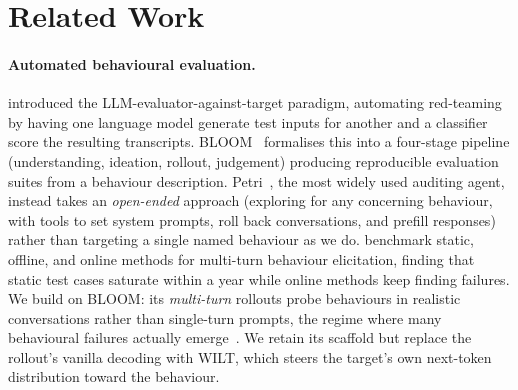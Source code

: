 \section{Related Work}\label{sec:related}

\paragraph{Automated behavioural evaluation.}
\citet{perez2022redteaming} introduced the LLM-evaluator-against-target paradigm, automating red-teaming by having one language model generate test inputs for another and a classifier score the resulting transcripts.
BLOOM~\citep{gupta2025bloom} formalises this into a four-stage pipeline (understanding, ideation, rollout, judgement) producing reproducible evaluation suites from a behaviour description.
Petri~\citep{fronsdal2025petri}, the most widely used auditing agent, instead takes an \emph{open-ended} approach (exploring for any concerning behaviour, with tools to set system prompts, roll back conversations, and prefill responses) rather than targeting a single named behaviour as we do.
\citet{huang2025multiturn} benchmark static, offline, and online methods for multi-turn behaviour elicitation, finding that static test cases saturate within a year while online methods keep finding failures.
We build on BLOOM: its \emph{multi-turn} rollouts probe behaviours in realistic conversations rather than single-turn prompts, the regime where many behavioural failures actually emerge~\citep{russinovich2024crescendo,anil2024manyshot}.
We retain its scaffold but replace the rollout's vanilla decoding with WILT, which steers the target's own next-token distribution toward the behaviour.


